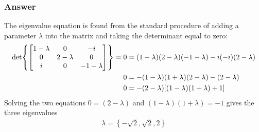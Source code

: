 \subsubsection{Answer}

The eigenvalue equation is found from the standard procedure of adding a
parameter ${\lambda}$ into the matrix and taking the determinant equal to zero:
\begin{align*}
    \det{\begin{bmatrix}
	1-{\lambda} & 0   & -i   \\
	0   & 2-{\lambda} & 0    \\
	i   & 0   & -1-{\lambda}
    \end{bmatrix}} = 0 &= (1-{\lambda})(2-{\lambda})(-1-{\lambda}) - i(-i)(2-{\lambda}) \\
    0 &= -(1-{\lambda})(1+{\lambda})(2-{\lambda}) - (2-{\lambda}) \\
    0 &= -(2-{\lambda})\qty[ (1-{\lambda})(1+{\lambda}) + 1]
\end{align*}
Solving the two equations $0 = (2 - {\lambda})$ and $(1-{\lambda})(1+{\lambda}) = -1$ gives the three
eigenvalues
\begin{align}
    \boxed{
    {\lambda} = \left\{ -\sqrt 2, \sqrt 2, 2 \right\}
    }
\end{align}

